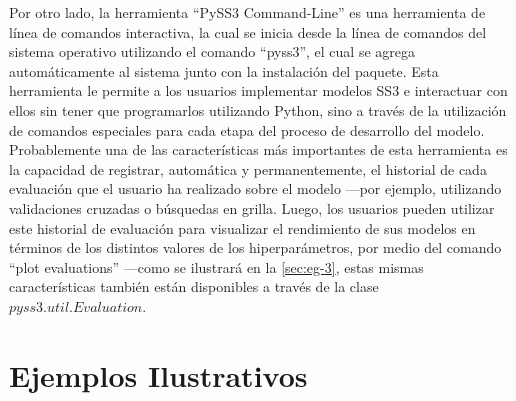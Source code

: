 Por otro lado, la herramienta ``PySS3 Command-Line'' es una herramienta de línea de comandos interactiva, la cual se inicia desde la línea de comandos del sistema operativo utilizando el comando ``pyss3'', el cual se agrega automáticamente al sistema junto con la instalación del paquete.
Esta herramienta le permite a los usuarios implementar modelos SS3 e interactuar con ellos sin tener que programarlos utilizando Python, sino a través de la utilización de comandos especiales para cada etapa del proceso de desarrollo del modelo. Probablemente una de las características más importantes de esta herramienta es la capacidad de registrar, automática y permanentemente, el historial de cada evaluación que el usuario ha realizado sobre el modelo ---por ejemplo, utilizando validaciones cruzadas o búsquedas en grilla. Luego, los usuarios pueden utilizar este historial de evaluación para visualizar el rendimiento de sus modelos en términos de los distintos valores de los hiperparámetros, por medio del comando ``plot evaluations'' ---como se ilustrará en la \autoref{sec:eg-3}, estas mismas características también están disponibles a través de la clase $pyss3.util.Evaluation$.

\section{Ejemplos Ilustrativos}
\label{sec:examples}

